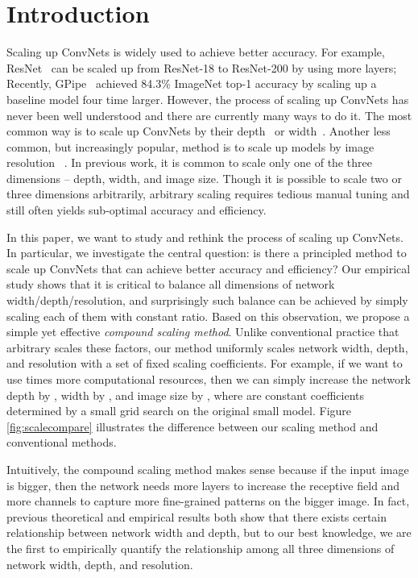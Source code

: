 \documentclass{article}
\begin{document}
 \section{Introduction}
Scaling up ConvNets is widely used to achieve better accuracy. For example, ResNet~\cite{resnet16} can be scaled up from
ResNet-18 to ResNet-200 by using more layers;  Recently, GPipe~\cite{gpipe18} achieved 84.3\% ImageNet top-1 accuracy by scaling up a baseline model four time larger. 
However, the process of  scaling up ConvNets has never been well understood and there are currently many ways to do it. The most common way is to scale up ConvNets by their depth~\cite{resnet16} or width~\cite{wideresnet16}. Another less common, but increasingly popular, method is to scale up models by image resolution ~\cite{gpipe18}.  In previous work, it is common to scale only one of the three dimensions -- depth, width, and image size. Though it is possible to scale  two or three dimensions  arbitrarily, arbitrary scaling requires tedious manual tuning and still often yields sub-optimal accuracy and efficiency.      
 

In this paper, we want to study and rethink the process of scaling up ConvNets. In particular, we investigate the central question: is there a principled method to scale up ConvNets that can achieve better accuracy and efficiency? 
Our empirical study shows that it is critical to  balance all dimensions of network width/depth/resolution, and surprisingly such balance can be achieved by simply scaling each of them with constant ratio. Based on this observation, we propose a simple yet effective \emph{compound scaling method}.  Unlike conventional practice that arbitrary scales  these factors, our method uniformly scales  network width, depth, and resolution with a set of fixed scaling coefficients. For example, if we want to use  times more computational resources, then we can simply increase the network depth by ,  width by , and image size by , where  are constant coefficients determined by a small grid search on the original small model. Figure \ref{fig:scalecompare} illustrates the difference between our  scaling method and conventional methods.


Intuitively, the compound scaling method makes sense because if the input image is bigger, then the network needs more layers to increase the receptive field and more channels to capture more fine-grained patterns on the bigger image. In fact, previous theoretical  \cite{expressdepth17,expresswidth18} and empirical results \cite{wideresnet16} both show that there exists certain relationship between network width and depth, but to our best knowledge, we are the first to empirically quantify the relationship among all three dimensions of network width, depth, and resolution.
\end{document}
